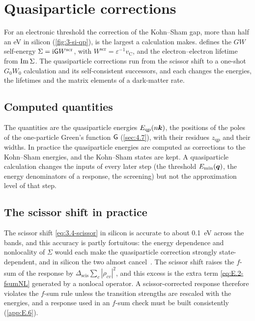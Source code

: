 \section{Quasiparticle corrections}\label{app:E.3}

For an electronic threshold the correction of the Kohn--Sham gap, more than half an eV in silicon (\cref{fig:3-si-qp}), is the largest a calculation makes.  defines the $GW$ self-energy $\Sigma = \mathrm{i}\mathsf{G} W^{\mathrm{scr}}$, with $W^{\mathrm{scr}} = \varepsilon^{-1}v_{\mathrm{C}}$, and the electron--electron lifetime from $\operatorname{Im}\Sigma$. The quasiparticle corrections run from the scissor shift to a one-shot $G_0W_0$ calculation and its self-consistent successors, and each changes the energies, the lifetimes and the matrix elements of a dark-matter rate.

\subsection{Computed quantities}

The quantities are the quasiparticle energies $E_{\mathrm{qp}}(n\bm{k})$, the positions of the poles of the one-particle Green's function $\mathsf{G}$ (\cref{sec:4.7}), with their residues $z_{\mathrm{qp}}$ and their widths. In practice the quasiparticle energies are computed as corrections to the Kohn--Sham energies, and the Kohn--Sham states are kept. A quasiparticle calculation changes the inputs of every later step (the threshold $E_{\mathrm{min}}(\bm{q})$, the energy denominators of a response, the screening) but not the approximation level of that step.

\subsection{The scissor shift in practice}

The scissor shift \cref{eq:3.4-scissor} in silicon is accurate to about \SI{0.1}{eV} across the bands, and this accuracy is partly fortuitous: the energy dependence and nonlocality of $\Sigma$ would each make the quasiparticle correction strongly state-dependent, and in silicon the two almost cancel~\cite[Sect.~V\,B]{aryasetiawan1998gw}. The scissor shift raises the $f$-sum of the response by $\Delta_{\mathrm{scis}}\sum_c|\rho_{cv}|^2$, and this excess is the extra term \cref{eq:E.2-fsumNL} generated by a nonlocal operator. A scissor-corrected response therefore violates the $f$-sum rule unless the transition strengths are rescaled with the energies, and a response used in an $f$-sum check must be built consistently (\cref{app:E.6}).

